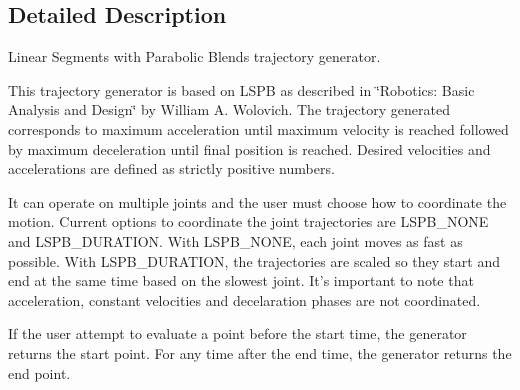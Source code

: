 \subsection{Detailed Description}
Linear Segments with Parabolic Blends trajectory generator. 

This trajectory generator is based on L\-S\-P\-B as described in \char`\"{}\-Robotics\-:
\-Basic Analysis and Design\char`\"{} by William A. Wolovich. The trajectory generated corresponds to maximum acceleration until maximum velocity is reached followed by maximum deceleration until final position is reached. Desired velocities and accelerations are defined as strictly positive numbers.

It can operate on multiple joints and the user must choose how to coordinate the motion. Current options to coordinate the joint trajectories are L\-S\-P\-B\-\_\-\-N\-O\-N\-E and L\-S\-P\-B\-\_\-\-D\-U\-R\-A\-T\-I\-O\-N. With L\-S\-P\-B\-\_\-\-N\-O\-N\-E, each joint moves as fast as possible. With L\-S\-P\-B\-\_\-\-D\-U\-R\-A\-T\-I\-O\-N, the trajectories are scaled so they start and end at the same time based on the slowest joint. It's important to note that acceleration, constant velocities and decelaration phases are not coordinated.

If the user attempt to evaluate a point before the start time, the generator returns the start point. For any time after the end time, the generator returns the end point. 

